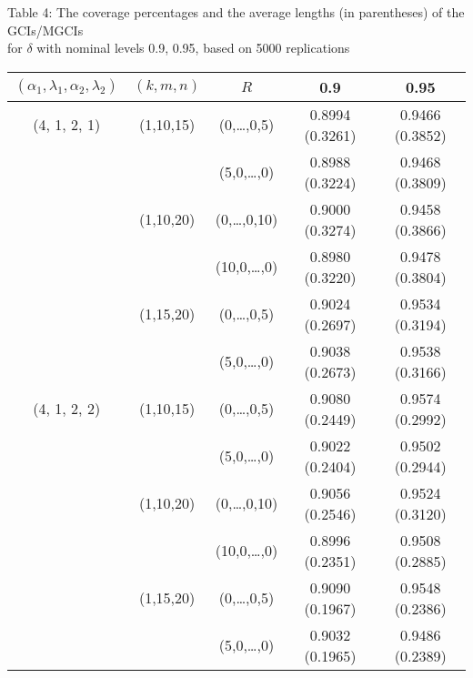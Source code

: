 \documentclass[12pt]{article}
\begin{document}
{\scriptsize
\begin{center}
{Table 4: The coverage percentages and the average lengths (in parentheses) of the GCIs/MGCIs\\ for $\delta$ with nominal levels 0.9, 0.95, based on 5000 replications}\\[5pt]
\begin{tabular}{ccccc}\hline
$(\alpha_1, \lambda_1, \alpha_2, \lambda_2)$&$(k,m,n)$ & $R$           & 0.9       &0.95     \\ \hline
(4, 1, 2, 1)                                &(1,10,15) & (0,\dots,0,5) & 0.8994 (0.3261)   &0.9466 (0.3852)\\
                                            &          & (5,0,\dots,0) & 0.8988 (0.3224)   &0.9468 (0.3809)\\
                                            &(1,10,20) & (0,\dots,0,10)& 0.9000 (0.3274)   &0.9458 (0.3866)\\
                                            &          & (10,0,\dots,0)& 0.8980 (0.3220)   &0.9478 (0.3804)\\
                                            &(1,15,20) & (0,\dots,0,5) & 0.9024 (0.2697)   &0.9534 (0.3194)\\
                                            &          & (5,0,\dots,0) & 0.9038 (0.2673)   &0.9538 (0.3166)\\
(4, 1, 2, 2)                                &(1,10,15) & (0,\dots,0,5) & 0.9080 (0.2449)   &0.9574 (0.2992)\\
                                            &          & (5,0,\dots,0) & 0.9022 (0.2404)   &0.9502 (0.2944)\\
                                            &(1,10,20) & (0,\dots,0,10)& 0.9056 (0.2546)   &0.9524 (0.3120)\\
                                            &          & (10,0,\dots,0)& 0.8996 (0.2351)   &0.9508 (0.2885)\\
                                            &(1,15,20) & (0,\dots,0,5) & 0.9090 (0.1967)   &0.9548 (0.2386)\\
                                            &          & (5,0,\dots,0) & 0.9032 (0.1965)   &0.9486 (0.2389) \\\hline
\end{tabular}
\end{center}}
\end{document}
